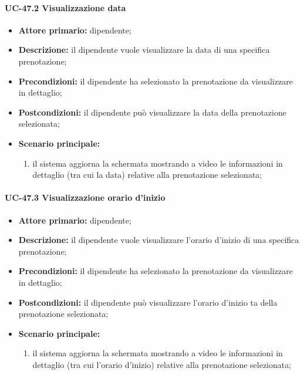 \paragraph{UC-47.2 Visualizzazione data}

    \begin{itemize}
        \item \textbf{Attore primario:} dipendente;

        \item \textbf{Descrizione:} il dipendente vuole visualizzare la data di una specifica prenotazione;

        \item \textbf{Precondizioni:} il dipendente ha selezionato la prenotazione da visualizzare in dettaglio;

        \item \textbf{Postcondizioni:} il dipendente può visualizzare la data della prenotazione selezionata;

        \item \textbf{Scenario principale:}
            \begin{enumerate}
                 \item il sistema aggiorna la schermata mostrando a video le informazioni in dettaglio (tra cui la data) relative alla prenotazione selezionata;
            \end{enumerate}
    \end{itemize} 

\paragraph{UC-47.3 Visualizzazione orario d'inizio}

    \begin{itemize}
        \item \textbf{Attore primario:} dipendente;

        \item \textbf{Descrizione:} il dipendente vuole visualizzare l'orario d'inizio di una specifica prenotazione;

        \item \textbf{Precondizioni:} il dipendente ha selezionato la prenotazione da visualizzare in dettaglio;

        \item \textbf{Postcondizioni:} il dipendente può visualizzare l'orario d'inizio ta della prenotazione selezionata;

        \item \textbf{Scenario principale:}
            \begin{enumerate}
                 \item il sistema aggiorna la schermata mostrando a video le informazioni in dettaglio (tra cui l'orario d'inizio) relative alla prenotazione selezionata;
            \end{enumerate}
    \end{itemize} 

